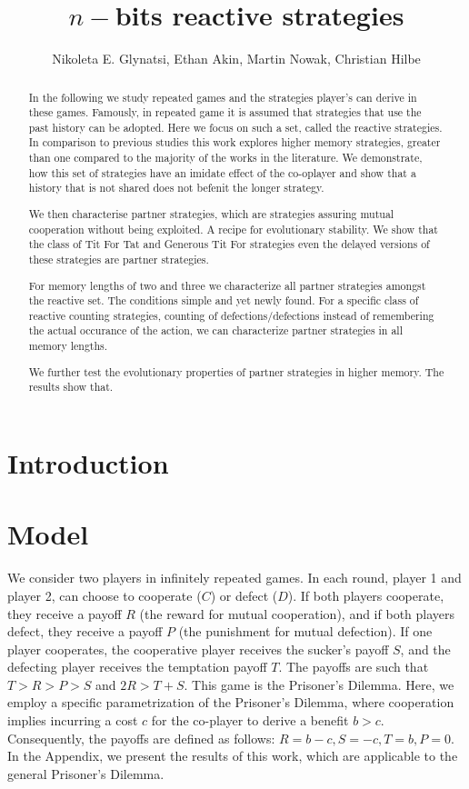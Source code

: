 \documentclass{article}
\title{$n-$bits reactive strategies}
\author{Nikoleta E. Glynatsi, Ethan Akin, Martin Nowak, Christian Hilbe}
\date{}
\theoremstyle{definition}
\begin{document}
\maketitle

\begin{abstract}

In the following we study repeated games and the strategies player's can
derive in these games. Famously, in repeated game it is assumed that strategies
that use the past history can be adopted. Here we focus on such a set, called the
reactive strategies. In comparison to previous studies this work explores higher
memory strategies, greater than one compared to the majority of the works in the
literature. We demonstrate, how this set of strategies have an imidate effect
of the co-oplayer and show that a history that is not shared does not befenit
the longer strategy.

We then characterise partner strategies, which are strategies assuring mutual
cooperation without being exploited. A recipe for evolutionary stability.
We show that the class of Tit For Tat and Generous Tit For strategies even the
delayed versions of these strategies are partner strategies.

For memory lengths of two and three we characterize all partner strategies
amongst the reactive set. The conditions simple and yet newly found. For a specific
class of reactive counting strategies, counting of defections/defections instead
of remembering the actual occurance of the action, we can characterize partner
strategies in all memory lengths.

We further test the evolutionary properties of partner strategies in higher memory.
The results show that.

\end{abstract}

\section{Introduction}

\section{Model}

We consider two players in infinitely repeated games. In each round, player 1
and player 2, can choose to cooperate ($C$) or defect ($D$). If both players
cooperate, they receive a payoff $R$ (the reward for mutual cooperation), and if
both players defect, they receive a payoff $P$ (the punishment for mutual
defection). If one player cooperates, the cooperative player receives the
sucker's payoff $S$, and the defecting player receives the temptation payoff
$T$. The payoffs are such that $T > R > P > S$ and $2 R > T + S$. This game is
the Prisoner's Dilemma. Here, we
employ a specific parametrization of the Prisoner's Dilemma, where cooperation
implies incurring a cost $c$ for the co-player to derive a benefit $b > c$.
Consequently, the payoffs are defined as follows: \(R = b - c, S = -c, T = b, P =
0\). In the Appendix, we present the results of this work, which are applicable to
the general Prisoner's Dilemma.
\end{document}

